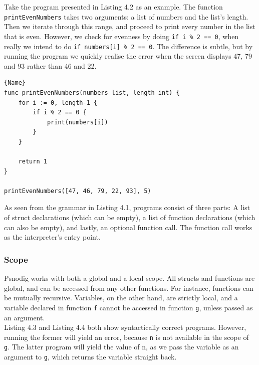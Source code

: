 Take the program presented in Listing 4.2 as an example. The function \\ \texttt{printEvenNumbers} takes two arguments: a list of numbers and the list's length. Then we iterate through this range, and proceed to print every number in the list that is even. However, we check for evenness by doing \texttt{if i \% 2 == 0}, when really we intend to do \texttt{if numbers[i] \% 2 == 0}. The difference is subtle, but by running the program we quickly realise the error when the screen displays 47, 79 and 93 rather than 46 and 22. \hfill \\

\begin{lstlisting}[caption={A syntactically correct program with a subtle logical error}, captionpos=b]{Name}
func printEvenNumbers(numbers list, length int) {
    for i := 0, length-1 {
        if i % 2 == 0 {
            print(numbers[i])
        }
    }

    return 1
}

printEvenNumbers([47, 46, 79, 22, 93], 5)
\end{lstlisting}


As seen from the grammar in Listing 4.1, programs consist of three parts: A list of struct declarations (which can be empty), a list of function declarations (which can also be empty), and lastly, an optional function call. The function call works as the interpreter's entry point.

\subsubsection{Scope}

Psnodig works with both a global and a local scope. All structs and functions are global, and can be accessed from any other functions. For instance, functions can be mutually recursive. Variables, on the other hand, are strictly local, and a variable declared in function \texttt{f} cannot be accessed in function \texttt{g}, unless passed as an argument. \hfill \\

Listing 4.3 and Listing 4.4 both show syntactically correct programs. However, running the former will yield an error, because \texttt{n} is not available in the scope of \texttt{g}. The latter program will yield the value of {n}, as we pass the variable as an argument to \texttt{g}, which returns the variable straight back. \hfill \\

